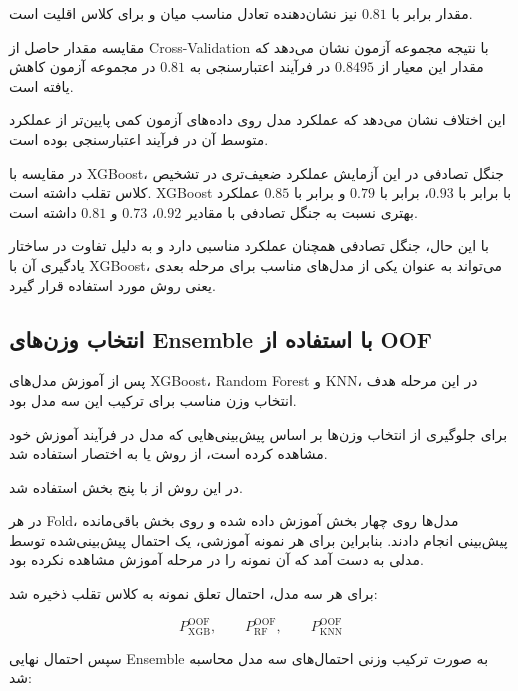 \documentclass[10pt,a4paper,twocolumn]{article}
\begin{document}
مقدار  برابر با $0.81$ نیز نشان‌دهنده تعادل
مناسب میان  و  برای کلاس اقلیت است.

مقایسه مقدار  حاصل از Cross-Validation با نتیجه
مجموعه آزمون نشان می‌دهد که مقدار این معیار از $0.8495$ در
فرآیند اعتبارسنجی به $0.81$ در مجموعه آزمون کاهش یافته است.

این اختلاف نشان می‌دهد که عملکرد مدل روی داده‌های آزمون
کمی پایین‌تر از عملکرد متوسط آن در فرآیند اعتبارسنجی بوده است.

در مقایسه با XGBoost، جنگل تصادفی در این آزمایش عملکرد
ضعیف‌تری در تشخیص کلاس تقلب داشته است. XGBoost با
 برابر با $0.93$،
 برابر با $0.79$ و
 برابر با $0.85$ عملکرد بهتری نسبت به جنگل
تصادفی با مقادیر $0.92$، $0.73$ و $0.81$ داشته است.

با این حال، جنگل تصادفی همچنان عملکرد مناسبی دارد و به دلیل
تفاوت در ساختار یادگیری آن با XGBoost، می‌تواند به عنوان یکی
از مدل‌های مناسب برای مرحله بعدی یعنی روش
 مورد استفاده قرار گیرد.


\subsection{انتخاب وزن‌های Ensemble با استفاده از OOF}

پس از آموزش مدل‌های XGBoost، Random Forest و KNN، در این مرحله
هدف انتخاب وزن مناسب برای ترکیب این سه مدل بود.

برای جلوگیری از انتخاب وزن‌ها بر اساس پیش‌بینی‌هایی که مدل در
فرآیند آموزش خود مشاهده کرده است، از روش
 یا به اختصار  استفاده شد.

در این روش از  با پنج
بخش استفاده شد.

در هر Fold، مدل‌ها روی چهار بخش آموزش داده شده و روی بخش
باقی‌مانده پیش‌بینی انجام دادند. بنابراین برای هر نمونه آموزشی،
یک احتمال پیش‌بینی‌شده توسط مدلی به دست آمد که آن نمونه را
در مرحله آموزش مشاهده نکرده بود.

برای هر سه مدل، احتمال تعلق نمونه به کلاس تقلب ذخیره شد:

\[
P_{\mathrm{XGB}}^{\mathrm{OOF}},
\qquad
P_{\mathrm{RF}}^{\mathrm{OOF}},
\qquad
P_{\mathrm{KNN}}^{\mathrm{OOF}}
\]

سپس احتمال نهایی Ensemble به صورت ترکیب وزنی احتمال‌های
سه مدل محاسبه شد:
\end{document}
